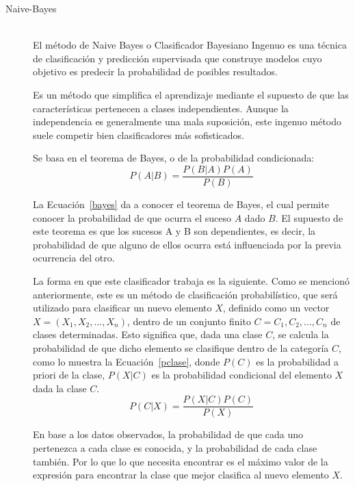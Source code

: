 \begin{enumerate}
\begin{description}
      \item[Naive-Bayes] \hfill \\
      El método de Naive Bayes o Clasificador Bayesiano Ingenuo es una técnica de clasificación y predicción supervisada que construye modelos cuyo objetivo es predecir la probabilidad de posibles resultados.
      
      Es un método que simplifica el aprendizaje mediante el supuesto de que las características pertenecen a clases independientes. Aunque la independencia es generalmente una mala suposición, este ingenuo método suele competir bien  clasificadores más sofisticados.
      
      Se basa en el teorema de Bayes, o de la probabilidad condicionada: 
      \begin{equation}\label{bayes}
      P(A|B)=\frac{P(B|A) P(A)}{P(B)}
      \end{equation}
      
      La Ecuación~\ref{bayes} da a conocer el teorema de Bayes, el cual permite conocer la probabilidad de que ocurra el suceso $A$ dado $B$. El supuesto de este teorema es que los sucesos A y B son dependientes, es decir, la probabilidad de que alguno de ellos ocurra está influenciada por la previa ocurrencia del otro.
      
      La forma en que este clasificador trabaja es la siguiente. Como se mencionó anteriormente, este es un método de clasificación probabilístico, que será utilizado para clasificar un nuevo elemento $X$, definido como un vector $X=(X_1, X_2, ..., X_n)$, dentro de un conjunto finito $C={C_1, C_2, ..., C_n}$ de clases determinadas. Esto significa que, dada una clase $C$, se calcula la probabilidad de que dicho elemento se clasifique dentro de la categoría $C$, como lo muestra la Ecuación~\ref{pclase}, donde $P(C)$ es la probabilidad a priori de la clase, $P(X|C)$ es la probabilidad condicional del elemento $X$ dada la clase $C$.
      \begin{equation}\label{pclase}
      P(C|X)=\frac{P(X|C) P(C)}{P(X)}
      \end{equation}
      
      En base a los datos observados, la probabilidad de que cada uno pertenezca a cada clase es conocida, y la probabilidad de cada clase también. Por lo que lo que necesita encontrar es el máximo valor de la expresión para encontrar la clase que mejor clasifica al nuevo elemento $X$. 
      

\end{description}
\end{enumerate}
